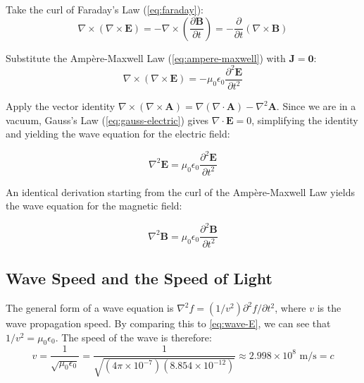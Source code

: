 \begin{derivationsteps}
    \step Take the curl of Faraday's Law (\cref{eq:faraday}):
    \begin{equation}
        \nabla \times (\nabla \times \mathbf{E}) = -\nabla \times \left(\frac{\partial \mathbf{B}}{\partial t}\right) = -\frac{\partial}{\partial t}(\nabla \times \mathbf{B})
        \label{eq:curl-faraday}
    \end{equation}

    \step Substitute the Ampère-Maxwell Law (\cref{eq:ampere-maxwell}) with $\mathbf{J} = \mathbf{0}$:
    \begin{equation}
        \nabla \times (\nabla \times \mathbf{E}) = -\mu_0 \epsilon_0 \frac{\partial^2 \mathbf{E}}{\partial t^2}
        \label{eq:curl-sub}
    \end{equation}

    \step Apply the vector identity $\nabla \times (\nabla \times \mathbf{A}) = \nabla(\nabla \cdot \mathbf{A}) - \nabla^2 \mathbf{A}$. Since we are in a vacuum, Gauss's Law (\cref{eq:gauss-electric}) gives $\nabla \cdot \mathbf{E} = 0$, simplifying the identity and yielding the wave equation for the electric field:
    \begin{tcolorbox}[colback=white, colframe=black!75, boxrule=0.5pt, sharp corners]
    \begin{equation}
        \nabla^2 \mathbf{E} = \mu_0 \epsilon_0 \frac{\partial^2 \mathbf{E}}{\partial t^2}
        \label{eq:wave-E}
    \end{equation}
    \end{tcolorbox}
    \step An identical derivation starting from the curl of the Ampère-Maxwell Law yields the wave equation for the magnetic field:
     \begin{tcolorbox}[colback=white, colframe=black!75, boxrule=0.5pt, sharp corners]
    \begin{equation}
        \nabla^2 \mathbf{B} = \mu_0 \epsilon_0 \frac{\partial^2 \mathbf{B}}{\partial t^2}
        \label{eq:wave-B}
    \end{equation}
    \end{tcolorbox}
\end{derivationsteps}


\subsection{Wave Speed and the Speed of Light}
The general form of a wave equation is $\nabla^2 f = (1/v^2) \partial^2 f/\partial t^2$, where $v$ is the wave propagation speed. By comparing this to \cref{eq:wave-E}, we can see that $1/v^2 = \mu_0 \epsilon_0$. The speed of the wave is therefore:
\begin{equation}
v = \frac{1}{\sqrt{\mu_0 \epsilon_0}} = \frac{1}{\sqrt{(4\pi \times 10^{-7})(8.854 \times 10^{-12})}} \approx 2.998 \times 10^8 \text{ m/s} = c
\label{eq:speed-of-light}
\end{equation}

